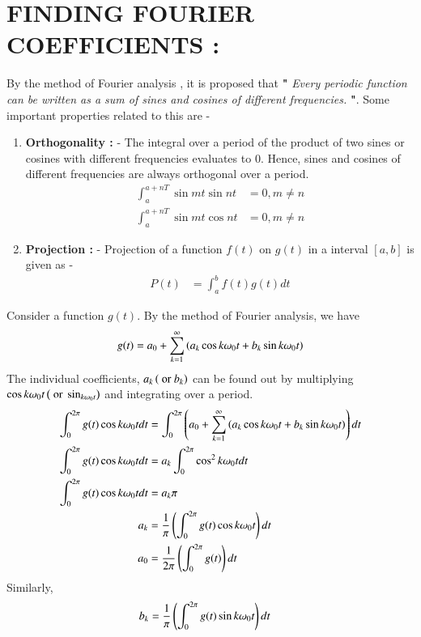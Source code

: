 \documentclass[journal]{IEEEtran}
\begin{document}
\section{\textbf{FINDING FOURIER COEFFICIENTS} : }
By the method of \color{blue} Fourier analysis \color{black}, it is proposed that \textbf{" } \textit{Every periodic function can be written as a sum of sines and cosines of different frequencies.} \textbf{ "}. Some important properties related to this are - 
\begin{enumerate}
\item \textbf{Orthogonality : } - The integral over a period of the product of two sines or cosines with different frequencies evaluates to $0$. Hence, sines and cosines of different frequencies are always orthogonal over a period.
\begin{align*}
	\int_{a}^{a + nT} \sin{mt} \sin{nt} &= 0, m \neq n \\
	\int_{a}^{a + nT} \sin{mt} \cos{nt} &= 0, m \neq n
\end{align*}
\item \textbf{Projection : } - Projection of a function $f(t)$ on $g(t)$ in a interval $[a,b]$ is given as - 
\begin{align*}
	P(t) &= \int_{a}^{b} f(t) g(t) dt
\end{align*}
\end{enumerate}
Consider a function $g(t)$. By the method of Fourier analysis, we have
\begin{equation}	
	g(t) = a_{0} + \sum_{k = 1}^{\infty} \left(a_{k} \cos{k \omega_{0} t} + b_{k} \sin{k \omega_{0} t}\right)
\end{equation}
The individual coefficients, $a_{k} \left(\text{ or } b_{k}\right)$  can be found out by multiplying $\cos{k \omega_{0} t} \left(\text{ or } \sin_{k \omega_{0} t}\right)$ and integrating over a period.
\begin{align*}
	\int_{0}^{2 \pi} g(t) \cos{k \omega_{0} t} dt &= \int_{0}^{2 \pi} \left(a_{0} + \sum_{k = 1}^{\infty} \left(a_{k} \cos{k \omega_{0} t} + b_{k} \sin{k \omega_{0} t}\right)\right) dt \\
	\int_{0}^{2 \pi} g(t) \cos{k \omega_{0} t} dt &= a_{k} \int_{0}^{2 \pi} \cos^{2}{k \omega_{0} t} dt \\
	\int_{0}^{2 \pi} g(t) \cos{k \omega_{0} t} dt &= a_{k} \pi \\
	a_{k} &= \frac{1}{\pi} \left(\int_{0}^{2 \pi} g(t) \cos{k \omega_{0} t}\right) dt \\
	a_{0} &= \frac{1}{2 \pi} \left(\int_{0}^{2 \pi} g(t)\right) dt
\end{align*}
Similarly, 
\begin{align*}
	b_{k} &= \frac{1}{\pi} \left(\int_{0}^{2 \pi} g(t) \sin{k \omega_{0} t}\right) dt
\end{align*}
\end{document}
